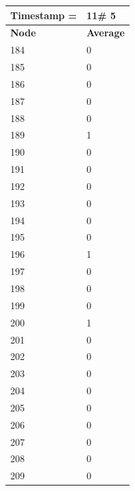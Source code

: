 \begin{tabular}{|l||l|}
\hline
\textbf{Timestamp =} & \textbf{11}\# 5\\\hline
	\textbf{Node} & \textbf{Average} \\ \hline
\hline
	184 & 0 \\ \hline
	185 & 0 \\ \hline
	186 & 0 \\ \hline
	187 & 0 \\ \hline
	188 & 0 \\ \hline
	189 & 1 \\ \hline
	190 & 0 \\ \hline
	191 & 0 \\ \hline
	192 & 0 \\ \hline
	193 & 0 \\ \hline
	194 & 0 \\ \hline
	195 & 0 \\ \hline
	196 & 1 \\ \hline
	197 & 0 \\ \hline
	198 & 0 \\ \hline
	199 & 0 \\ \hline
	200 & 1 \\ \hline
	201 & 0 \\ \hline
	202 & 0 \\ \hline
	203 & 0 \\ \hline
	204 & 0 \\ \hline
	205 & 0 \\ \hline
	206 & 0 \\ \hline
	207 & 0 \\ \hline
	208 & 0 \\ \hline
	209 & 0 \\ \hline
\end{tabular}

